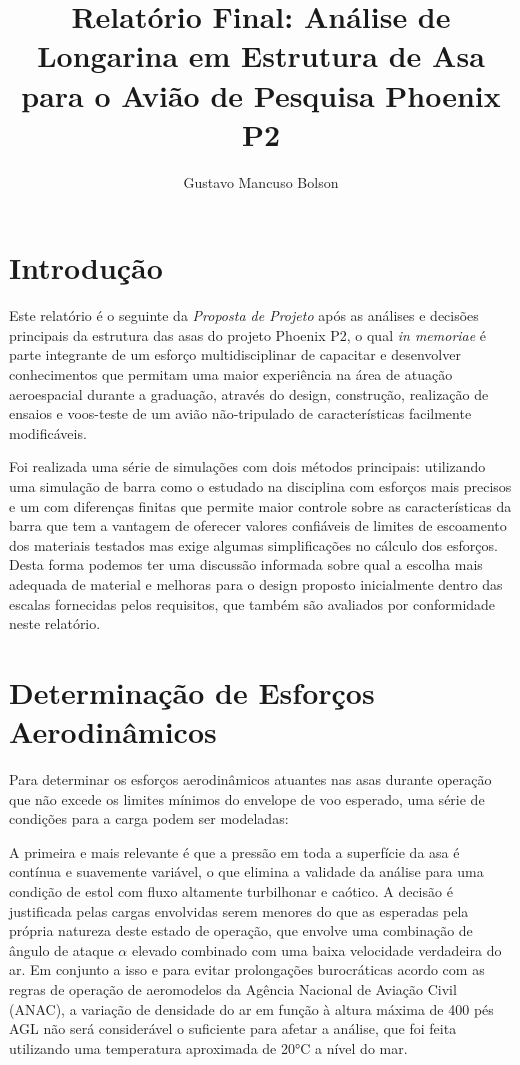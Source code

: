 \documentclass[a4paper]{article}
\title{\Large{\textbf{Relatório Final: Análise de Longarina em Estrutura de Asa para o Avião de Pesquisa Phoenix P2}}}
\author{Gustavo Mancuso Bolson}
\begin{document}
\maketitle

\section{Introdução}

Este relatório é o seguinte da \textit{Proposta de Projeto} após as análises e decisões principais da estrutura das asas do projeto Phoenix P2, o qual \textit{in memoriae} é parte integrante de um esforço multidisciplinar de capacitar e desenvolver conhecimentos que permitam uma maior experiência na área de atuação aeroespacial durante a graduação, através do design, construção, realização de ensaios e voos-teste de um avião não-tripulado de características facilmente modificáveis.

Foi realizada uma série de simulações com dois métodos principais: utilizando uma simulação de barra como o estudado na disciplina com esforços mais precisos e um com diferenças finitas que permite maior controle sobre as características da barra que tem a vantagem de oferecer valores confiáveis de limites de escoamento dos materiais testados mas exige algumas simplificações no cálculo dos esforços. Desta forma podemos ter uma discussão informada sobre qual a escolha mais adequada de material e melhoras para o design proposto inicialmente dentro das escalas fornecidas pelos requisitos, que também são avaliados por conformidade neste relatório.

\section{Determinação de Esforços Aerodinâmicos}

Para determinar os esforços aerodinâmicos atuantes nas asas durante operação que não excede os limites mínimos do envelope de voo esperado, uma série de condições para a carga podem ser modeladas: 

A primeira e mais relevante é que a pressão em toda a superfície da asa é contínua e suavemente variável, o que elimina a validade da análise para uma condição de estol com fluxo altamente turbilhonar e caótico. A decisão é justificada pelas cargas envolvidas serem menores do que as esperadas pela própria natureza deste estado de operação, que envolve uma combinação de ângulo de ataque $\alpha$ elevado combinado com uma baixa velocidade verdadeira do ar. Em conjunto a isso e para evitar prolongações burocráticas acordo com as regras de operação de aeromodelos da Agência Nacional de Aviação Civil (ANAC), a variação de densidade do ar em função à altura máxima de 400 pés AGL \cite{anacdrones} não será considerável o suficiente para afetar a análise, que foi feita utilizando uma temperatura aproximada de 20°C a nível do mar.
\end{document}

